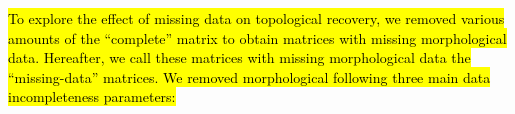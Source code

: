 \documentclass[12pt,letterpaper]{article}
\begin{document}

\hl{To explore the effect of missing data on topological recovery, we removed various amounts of the ``complete'' matrix to obtain matrices with missing morphological data.
Hereafter, we call these matrices with missing morphological data the ``missing-data'' matrices.
We removed morphological following three main data incompleteness parameters:}
\end{document}
